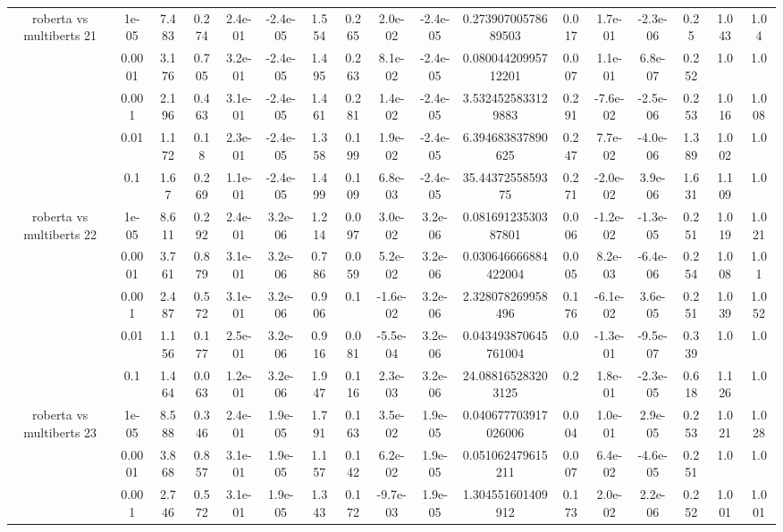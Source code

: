 \begin{tabular}{|c|c|c|c|c|c|c|c|c|c|c|c|c|c|c|c|c|}
\hline
\multirow{5}{*}{roberta  vs multiberts 21} & 1e-05 & 7.483 & 0.274 & 2.4e-01 & -2.4e-05 & 1.554 & 0.265 & 2.0e-02 & -2.4e-05 & 0.27390700578689503 & 0.017 & 1.7e-01 & -2.3e-06 & 0.25 & 1.043 & 1.04 \\
 & 0.0001 & 3.176 & 0.705 & 3.2e-01 & -2.4e-05 & 1.495 & 0.263 & 8.1e-02 & -2.4e-05 & 0.08004420995712201 & 0.007 & 1.1e-01 & 6.8e-07 & 0.252 & 1.0 & 1.0 \\
 & 0.001 & 2.196 & 0.463 & 3.1e-01 & -2.4e-05 & 1.461 & 0.281 & 1.4e-02 & -2.4e-05 & 3.5324525833129883 & 0.291 & -7.6e-02 & -2.5e-06 & 0.253 & 1.016 & 1.008 \\
 & 0.01 & 1.172 & 0.18 & 2.3e-01 & -2.4e-05 & 1.358 & 0.199 & 1.9e-02 & -2.4e-05 & 6.394683837890625 & 0.247 & 7.7e-02 & -4.0e-06 & 1.389 & 1.002 & 1.0 \\
 & 0.1 & 1.67 & 0.269 & 1.1e-01 & -2.4e-05 & 1.499 & 0.109 & 6.8e-03 & -2.4e-05 & 35.4437255859375 & 0.271 & -2.0e-02 & 3.9e-06 & 1.631 & 1.109 & 1.0 \\
\hline
\multirow{5}{*}{roberta  vs multiberts 22} & 1e-05 & 8.611 & 0.292 & 2.4e-01 & 3.2e-06 & 1.214 & 0.097 & 3.0e-02 & 3.2e-06 & 0.08169123530387801 & 0.006 & -1.2e-02 & -1.3e-05 & 0.251 & 1.019 & 1.021 \\
 & 0.0001 & 3.761 & 0.879 & 3.1e-01 & 3.2e-06 & 0.786 & 0.059 & 5.2e-02 & 3.2e-06 & 0.030646666884422004 & 0.005 & 8.2e-03 & -6.4e-06 & 0.254 & 1.008 & 1.01 \\
 & 0.001 & 2.487 & 0.572 & 3.1e-01 & 3.2e-06 & 0.906 & 0.1 & -1.6e-02 & 3.2e-06 & 2.328078269958496 & 0.176 & -6.1e-02 & 3.6e-05 & 0.251 & 1.039 & 1.052 \\
 & 0.01 & 1.156 & 0.177 & 2.5e-01 & 3.2e-06 & 0.916 & 0.081 & -5.5e-04 & 3.2e-06 & 0.043493870645761004 & 0.0 & -1.3e-01 & -9.5e-07 & 0.339 & 1.0 & 1.0 \\
 & 0.1 & 1.464 & 0.063 & 1.2e-01 & 3.2e-06 & 1.947 & 0.116 & 2.3e-03 & 3.2e-06 & 24.088165283203125 & 0.2 & 1.8e-01 & -2.3e-05 & 0.618 & 1.126 & 1.0 \\
\hline
\multirow{5}{*}{roberta  vs multiberts 23} & 1e-05 & 8.588 & 0.346 & 2.4e-01 & 1.9e-05 & 1.791 & 0.163 & 3.5e-02 & 1.9e-05 & 0.040677703917026006 & 0.004 & 1.0e-01 & 2.9e-05 & 0.253 & 1.021 & 1.028 \\
 & 0.0001 & 3.868 & 0.857 & 3.1e-01 & 1.9e-05 & 1.157 & 0.142 & 6.2e-02 & 1.9e-05 & 0.051062479615211 & 0.007 & 6.4e-02 & -4.6e-05 & 0.251 & 1.0 & 1.0 \\
 & 0.001 & 2.746 & 0.572 & 3.1e-01 & 1.9e-05 & 1.343 & 0.172 & -9.7e-03 & 1.9e-05 & 1.304551601409912 & 0.173 & 2.0e-02 & 2.2e-06 & 0.252 & 1.001 & 1.001 \\

\end{tabular}
